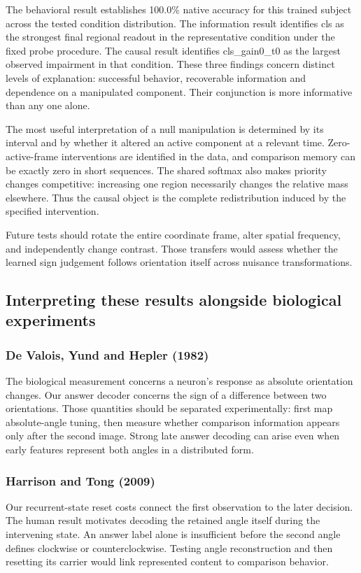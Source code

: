 \documentclass[11pt]{article}
\begin{document}
The behavioral result establishes 100.0\% native accuracy for this trained subject across the tested condition distribution. The information result identifies cls as the strongest final regional readout in the representative condition under the fixed probe procedure. The causal result identifies cls\_\allowbreak{}gain0\_\allowbreak{}t0 as the largest observed impairment in that condition. These three findings concern distinct levels of explanation: successful behavior, recoverable information and dependence on a manipulated component. Their conjunction is more informative than any one alone.

The most useful interpretation of a null manipulation is determined by its interval and by whether it altered an active component at a relevant time. Zero-active-frame interventions are identified in the data, and comparison memory can be exactly zero in short sequences. The shared softmax also makes priority changes competitive: increasing one region necessarily changes the relative mass elsewhere. Thus the causal object is the complete redistribution induced by the specified intervention.

Future tests should rotate the entire coordinate frame, alter spatial frequency, and independently change contrast. Those transfers would assess whether the learned sign judgement follows orientation itself across nuisance transformations.

\subsection{Interpreting these results alongside biological experiments}
\subsubsection{De Valois, Yund and Hepler (1982)}
The biological measurement concerns a neuron’s response as absolute orientation changes. Our answer decoder concerns the sign of a difference between two orientations. Those quantities should be separated experimentally: first map absolute-angle tuning, then measure whether comparison information appears only after the second image. Strong late answer decoding can arise even when early features represent both angles in a distributed form. \cite{bio_devalois_o}

\subsubsection{Harrison and Tong (2009)}
Our recurrent-state reset costs connect the first observation to the later decision. The human result motivates decoding the retained angle itself during the intervening state. An answer label alone is insufficient before the second angle defines clockwise or counterclockwise. Testing angle reconstruction and then resetting its carrier would link represented content to comparison behavior. \cite{bio_harrison}
\end{document}
